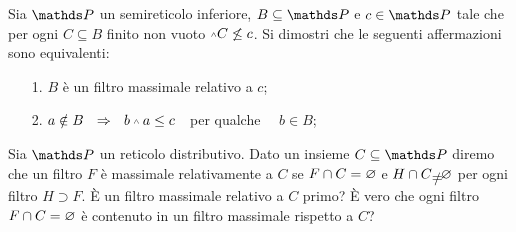 \begin{exercise}
Sia $\PP$ un semireticolo inferiore, $B\subseteq \PP$ e $c\in\PP$ tale che per ogni $C\subseteq B$ finito non vuoto $\swedge C \not\le c$. Si dimostri che le seguenti affermazioni sono equivalenti:
\begin{itemize}
\item[1.] $B$ \`e un filtro massimale relativo a $c$;
\item[2.] $a\notin B\ \ \IMP\ \ b\swedge a \le c$\ \  per qualche \ \ $b\in B$;
\end{itemize}
\end{exercise}


\begin{exercise}
Sia $\PP$ un reticolo distributivo. Dato un insieme $C\subseteq\PP$ diremo che un filtro $F$ \`e massimale relativamente a $C$ se $F\cap C=\varnothing$ e $H\cap C\neq\0$ per ogni filtro $H\supset F$. \`E un filtro massimale relativo a $C$ primo? \`E vero che ogni filtro $F\cap C=\varnothing$ \`e contenuto in un filtro massimale rispetto a $C$?\QED
\end{exercise}


